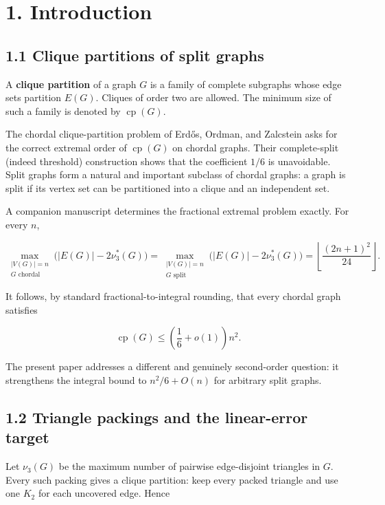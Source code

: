 \documentclass[11pt,a4paper]{article}
\begin{document}
\section{1. Introduction}\label{introduction}

\subsection{1.1 Clique partitions of split graphs}\label{clique-partitions-of-split-graphs}

A \textbf{clique partition} of a graph \(G\) is a family of complete subgraphs whose edge sets partition \(E(G)\). Cliques of order two are allowed. The minimum size of such a family is denoted by \(\operatorname{cp}(G)\).

The chordal clique-partition problem of Erdős, Ordman, and Zalcstein asks for the correct extremal order of \(\operatorname{cp}(G)\) on chordal graphs. Their complete-split (indeed threshold) construction shows that the coefficient \(1/6\) is unavoidable. Split graphs form a natural and important subclass of chordal graphs: a graph is split if its vertex set can be partitioned into a clique and an independent set.

A companion manuscript determines the fractional extremal problem exactly. For every \(n\),

\[
\max_{\substack{|V(G)|=n\\G\text{ chordal}}}
\bigl(|E(G)|-2\nu_3^*(G)\bigr)
=
\max_{\substack{|V(G)|=n\\G\text{ split}}}
\bigl(|E(G)|-2\nu_3^*(G)\bigr)
=
\left\lfloor\frac{(2n+1)^2}{24}\right\rfloor.
\]

It follows, by standard fractional-to-integral rounding, that every chordal graph satisfies

\[
\operatorname{cp}(G)
\le
\left(\frac16+o(1)\right)n^2.
\]

The present paper addresses a different and genuinely second-order question: it strengthens the integral bound to \(n^2/6+O(n)\) for arbitrary split graphs.

\subsection{1.2 Triangle packings and the linear-error target}\label{triangle-packings-and-the-linear-error-target}

Let \(\nu_3(G)\) be the maximum number of pairwise edge-disjoint triangles in \(G\). Every such packing gives a clique partition: keep every packed triangle and use one \(K_2\) for each uncovered edge. Hence
\end{document}
